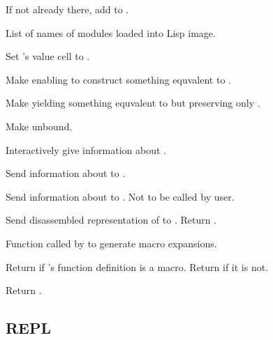 \begin{LIST}{1cm}
  If not already there, add  to .

  List of names of modules loaded into Lisp image.

  Set 's value cell to .

  Make  enabling  to construct
  something equvalent to .

  Make  yielding something equvalent to 
  but preserving only .

  Make  unbound.

  Interactively give information about .

  Send information about  to .

  Send information about  to . Not to be
  called by user.

  Send disassembled representation of  to
  . Return \retval{\NIL}.

  Function called by  to generate macro expansions.

  Return  if 's function definition
  is a macro. Return \retval{\NIL} if it is not.

  Return .

\end{LIST}


\subsection{REPL} 

